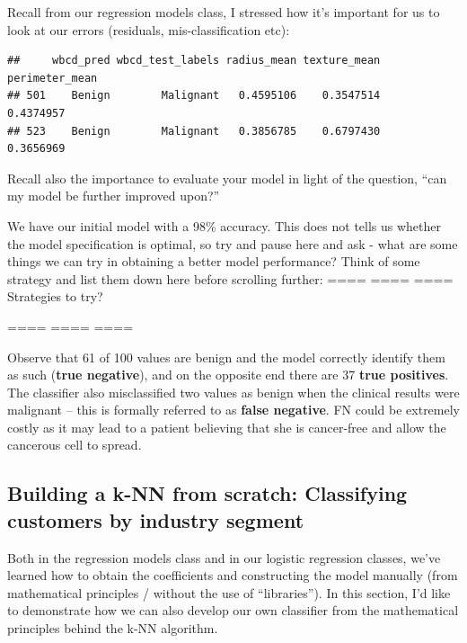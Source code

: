 \documentclass[
]{article}
\newenvironment{Shaded}{\begin{snugshade}}{\end{snugshade}}
\newcommand{\NormalTok}[1]{#1}
\newcommand{\SpecialCharTok}[1]{\textcolor[rgb]{0.00,0.00,0.00}{#1}}
\begin{document}
Recall from our regression models class, I stressed how it's important
for us to look at our errors (residuals, mis-classification etc):

\begin{Shaded}
\end{Shaded}

\begin{verbatim}
##     wbcd_pred wbcd_test_labels radius_mean texture_mean perimeter_mean
## 501    Benign        Malignant   0.4595106    0.3547514      0.4374957
## 523    Benign        Malignant   0.3856785    0.6797430      0.3656969
\end{verbatim}

Recall also the importance to evaluate your model in light of the
question, ``can my model be further improved upon?''

We have our initial model with a 98\% accuracy. This does not tells us
whether the model specification is optimal, so try and pause here and
ask - what are some things we can try in obtaining a better model
performance? Think of some strategy and list them down here before
scrolling further: ==== ==== ==== Strategies to try?

==== ==== ====

Observe that 61 of 100 values are benign and the model correctly
identify them as such (\textbf{true negative}), and on the opposite end
there are 37 \textbf{true positives}. The classifier also misclassified
two values as benign when the clinical results were malignant -- this is
formally referred to as \textbf{false negative}. FN could be extremely
costly as it may lead to a patient believing that she is cancer-free and
allow the cancerous cell to spread.

\hypertarget{building-a-k-nn-from-scratch-classifying-customers-by-industry-segment}{%
\subsection{Building a k-NN from scratch: Classifying customers by
industry
segment}\label{building-a-k-nn-from-scratch-classifying-customers-by-industry-segment}}

Both in the regression models class and in our logistic regression
classes, we've learned how to obtain the coefficients and constructing
the model manually (from mathematical principles / without the use of
``libraries''). In this section, I'd like to demonstrate how we can also
develop our own classifier from the mathematical principles behind the
k-NN algorithm.
\end{document}
